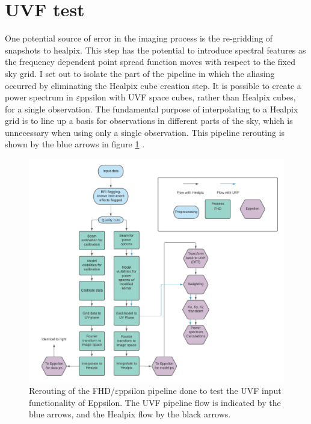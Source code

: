 \documentclass[linenumbers]{aastex631}
\newcommand\eppsilon{$\varepsilon$ppsilon\xspace}
\begin{document}
\section{UVF test}
One potential source of error in the imaging process is the re-gridding of snapshots to healpix. This step has the potential to introduce spectral features as the frequency dependent point spread function moves with respect to the fixed sky grid. I set out to isolate the part of the pipeline in which the aliasing occurred by eliminating the Healpix cube creation step. It is possible to create a power spectrum in 
\eppsilon{} with UVF space cubes, rather than Healpix cubes, for a single observation. The fundamental purpose of interpolating to a Healpix grid is to line up a basis for observations in different parts of the sky, which is unnecessary when using only a single observation. 
This pipeline rerouting is shown by the blue arrows in figure \ref{fig:uvfreroute} . 

\begin{figure}[h!]
    \centering
    \includegraphics[scale=.4]{uvftest.png}
    \caption{Rerouting of the FHD/\eppsilon{} pipeline done to test the UVF input functionality of Eppsilon. The UVF pipeline flow is indicated by the blue arrows, and the Healpix flow by the black arrows.}
    \label{fig:uvfreroute}
\end{figure}
\end{document}
